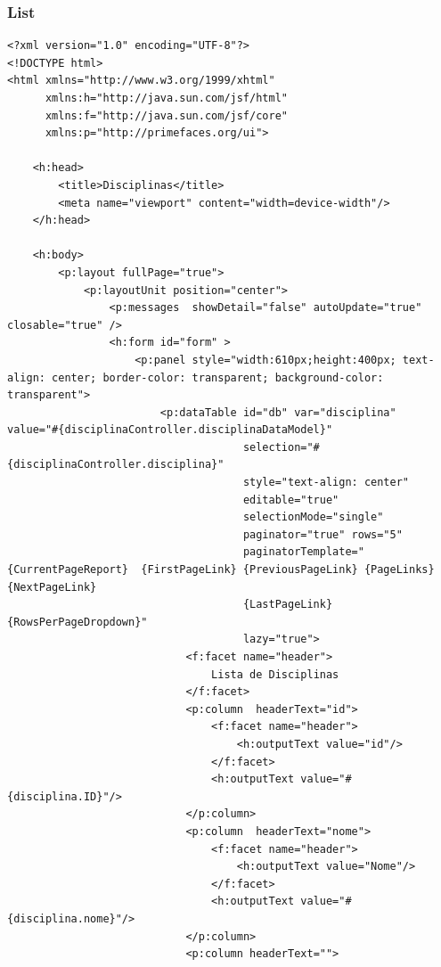 \documentclass[12pt,a4paper]{article}
\begin{document}
\subsubsection{List}
\label{subsubsectionDisciplinaList}
\begin{lstlisting}
<?xml version="1.0" encoding="UTF-8"?>
<!DOCTYPE html>
<html xmlns="http://www.w3.org/1999/xhtml"
      xmlns:h="http://java.sun.com/jsf/html"
      xmlns:f="http://java.sun.com/jsf/core"
      xmlns:p="http://primefaces.org/ui">

    <h:head>
        <title>Disciplinas</title>
        <meta name="viewport" content="width=device-width"/>
    </h:head>

    <h:body>
        <p:layout fullPage="true">
            <p:layoutUnit position="center">
                <p:messages  showDetail="false" autoUpdate="true" closable="true" />
                <h:form id="form" >
                    <p:panel style="width:610px;height:400px; text-align: center; border-color: transparent; background-color: transparent">  
                        <p:dataTable id="db" var="disciplina"  value="#{disciplinaController.disciplinaDataModel}"
                                     selection="#{disciplinaController.disciplina}"
                                     style="text-align: center" 
                                     editable="true"
                                     selectionMode="single"
                                     paginator="true" rows="5"  
                                     paginatorTemplate="{CurrentPageReport}  {FirstPageLink} {PreviousPageLink} {PageLinks} {NextPageLink} 
                                     {LastPageLink} {RowsPerPageDropdown}"
                                     lazy="true">  
                            <f:facet name="header">  
                                Lista de Disciplinas
                            </f:facet>  
                            <p:column  headerText="id">
                                <f:facet name="header">
                                    <h:outputText value="id"/>
                                </f:facet>
                                <h:outputText value="#{disciplina.ID}"/>
                            </p:column>
                            <p:column  headerText="nome">  
                                <f:facet name="header">
                                    <h:outputText value="Nome"/>
                                </f:facet>
                                <h:outputText value="#{disciplina.nome}"/>
                            </p:column> 
                            <p:column headerText="">

\end{lstlisting}
\end{document}
